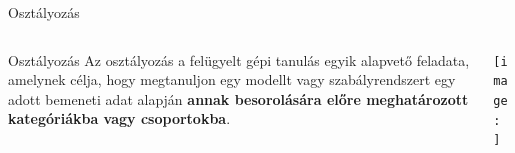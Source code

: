\documentclass[english, aspectratio=169]{beamer}
\begin{document}
\begin{frame}{Osztályozás}
\begin{columns}
\begin{column}{.5\textwidth}
\begin{block}{Osztályozás}
Az osztályozás a felügyelt gépi tanulás egyik alapvető feladata, amelynek célja, hogy megtanuljon egy modellt vagy szabályrendszert egy adott bemeneti adat alapján \textbf{annak besorolására előre meghatározott kategóriákba vagy csoportokba}. 
\end{block}
\end{column}
\begin{column}{.5\textwidth}
\begin{center}
\texttt{[image: ]}
\end{center}
\end{column}
\end{columns}
\end{frame}
\end{document}
